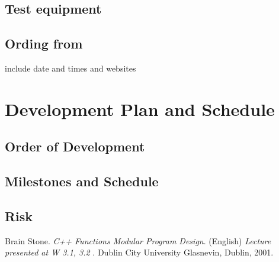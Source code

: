 \documentclass[11pt]{article}
\begin{document}
\subsection{Test equipment}
\subsection{Ording from}
include date and times and websites

\section{Development Plan and Schedule}
\subsection{Order of Development}
\subsection{Milestones and Schedule}
\subsection{Risk}

\begin{thebibliography}{1}
Brain Stone. 
\textit{C++ Functions Modular Program Design}. (English) 
\textit{ Lecture presented at W 3.1, 3.2 }. 
Dublin City University Glasnevin, Dublin, 2001.
\end{thebibliography}
\end{document}
